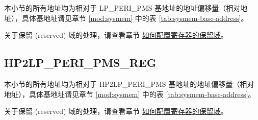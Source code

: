\documentclass[main\_\_CN.tex]{subfiles}
\begin{document}
本小节的所有地址均为相对于 LP\_PERI\_PMS 基地址的地址偏移量（相对地址），具体基地址请见章节 \ref{mod:sysmem}
\textit{} 中的表 \ref{tab:sysmem-base-address}。

关于保留 (reserved) 域的处理，请查看章节 \hyperref[programming-reserved-field]{如何配置寄存器的保留域}。



\subsection{HP2LP\_PERI\_PMS\_REG}

本小节的所有地址均为相对于 HP2LP\_PERI\_PMS 基地址的地址偏移量（相对地址），具体基地址请见章节 \ref{mod:sysmem}
\textit{} 中的表 \ref{tab:sysmem-base-address}。

关于保留 (reserved) 域的处理，请查看章节 \hyperref[programming-reserved-field]{如何配置寄存器的保留域}。


\end{document}
